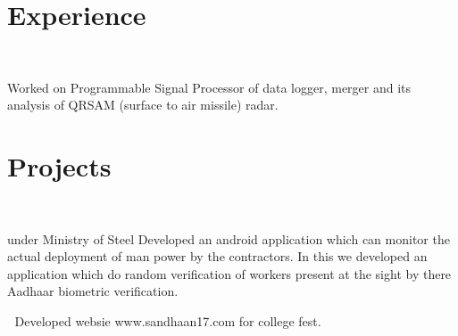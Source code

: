 \documentclass[a4paper]{manish-resume} %
\begin{document}
\hfill
%
%
\begin{minipage}[t]{0.66\textwidth} %


\section{Experience}

\\

\vspace{\topsep} %
\begin{tightitemize}
\item Worked on Programmable Signal Processor of data logger, merger and its analysis of QRSAM (surface to air missile) radar.

\end{tightitemize}

\sectionspace %

\section{Projects}

\\

\begin{tightitemize}
\item under Ministry of Steel Developed an android application which can monitor the actual deployment of man power by the contractors. In this we developed an application which do random verification of workers present at the sight by there Aadhaar biometric verification.

\end{tightitemize}
  Developed websie www.sandhaan17.com for college fest. 
 



\end{minipage}
\end{document}

